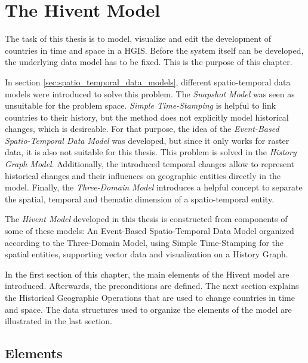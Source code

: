 
\chapter{The Hivent Model} %
\label{cha:the_hivent_model}

The task of this thesis is to model, visualize and edit the development of countries in time and space in a HGIS. Before the system itself can be developed, the underlying data model has to be fixed. This is the purpose of this chapter.

In section \ref{sec:spatio_temporal_data_models}, different spatio-temporal data models were introduced to solve this problem. The \emph{Snapshot Model} was seen as unsuitable for the problem space. \emph{Simple Time-Stamping} is helpful to link countries to their history, but the method does not explicitly model historical changes, which is desireable. For that purpose, the idea of the \emph{Event-Based Spatio-Temporal Data Model} was developed, but since it only works for raster data, it is also not suitable for this thesis. This problem is solved in the \emph{History Graph Model}. Additionally, the introduced temporal changes allow to represent historical changes and their influences on geographic entities directly in the model. Finally, the \emph{Three-Domain Model} introduces a helpful concept to separate the spatial, temporal and thematic dimension of a spatio-temporal entity.

The \emph{Hivent Model} developed in this thesis is constructed from components of some of these models: An Event-Based Spatio-Temporal Data Model organized according to the Three-Domain Model, using Simple Time-Stamping for the spatial entities, supporting vector data and visualization on a History Graph.

In the first section of this chapter, the main elements of the Hivent model are introduced. Afterwards, the preconditions are defined. The next section explains the Historical Geographic Operations that are used to change countries in time and space. The data structures used to organize the elements of the model are illustrated in the last section.

\section{Elements} %
\label{sec:elements}

